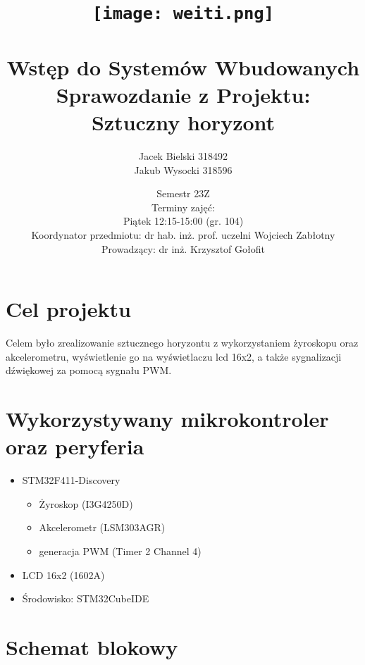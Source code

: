 \documentclass[12pt]{article}
\title{\texttt{[image: weiti.png]}\\\\Wstęp do Systemów Wbudowanych\\ Sprawozdanie z Projektu:\\ Sztuczny horyzont}
\author{Jacek Bielski 318492\\ Jakub Wysocki 318596}
\date{Semestr 23Z\\
Terminy zajęć: \\
Piątek 12:15-15:00 (gr. 104)\\
Koordynator przedmiotu: dr hab. inż. prof. uczelni Wojciech Zabłotny \\
Prowadzący: dr inż. Krzysztof Gołofit}
\let\origfigure\figure
\let\endorigfigure\endfigure
\renewenvironment{figure}[1][2] {
    \expandafter\origfigure\expandafter[H]
} {
    \endorigfigure
}
\begin{document}
\maketitle
\newpage

\section{Cel projektu}
        Celem było zrealizowanie sztucznego horyzontu z wykorzystaniem żyroskopu oraz akcelerometru, wyświetlenie go na wyświetlaczu lcd 16x2, a także sygnalizacji dźwiękowej za pomocą sygnału PWM.


\section{Wykorzystywany mikrokontroler oraz peryferia}
        \begin{itemize}
            \item STM32F411-Discovery
                \begin{itemize}
                    \item Żyroskop (I3G4250D)
                    \item Akcelerometr (LSM303AGR)
                    \item generacja PWM (Timer 2 Channel 4)
                \end{itemize}
            \item LCD 16x2 (1602A)
            \item Środowisko: STM32CubeIDE
        \end{itemize}


\section{Schemat blokowy}
  \begin{figure}[H]
\centering
{}
\end{figure}
\end{document}
